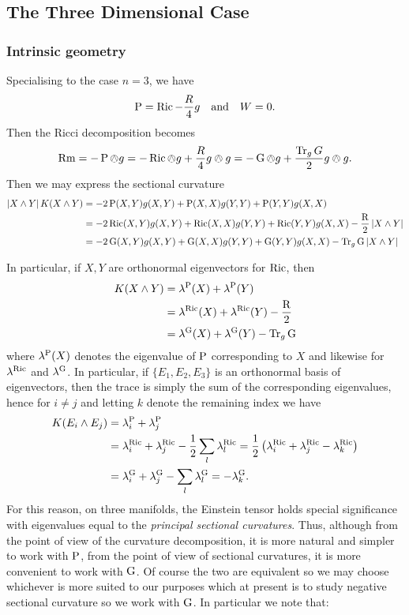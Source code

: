 \documentclass[a4paper, 12pt]{amsart}
\begin{document}
\subsection{The Three Dimensional Case}
\label{subsec:notation_threedim}

\subsubsection{Intrinsic geometry}

Specialising to the case \(n = 3\), we have
\[
\operatorname{P} = \operatorname{Ric} - \frac{R}{4} g \quad \text{and} \quad W = 0.
\]
Then the Ricci decomposition becomes
\[
\operatorname{Rm} = -\operatorname{P} \owedge g = -\operatorname{Ric} \owedge g + \frac{R}{4} g \owedge g = -\operatorname{G} \owedge g + \frac{\operatorname{Tr}_g G}{2} g \owedge g.
\]
Then we may express the sectional curvature
\begin{align*}
\left\lvert{X \wedge Y}\right\rvert K(X \wedge Y) &= -2\operatorname{P}(X, Y) g(X, Y) + \operatorname{P}(X, X) g(Y, Y) + \operatorname{P}(Y, Y) g(X, X) \\
&= -2\operatorname{Ric}(X, Y) g(X, Y) + \operatorname{Ric}(X, X) g(Y, Y) + \operatorname{Ric}(Y, Y) g(X, X) - \frac{\operatorname{R}}{2} \left\lvert{X \wedge Y}\right\rvert \\
&= -2\operatorname{G}(X, Y) g(X, Y) + \operatorname{G}(X, X) g(Y, Y) + \operatorname{G}(Y, Y) g(X, X) - \operatorname{Tr}_g \operatorname{G} \left\lvert{X \wedge Y}\right\rvert \\
\end{align*}

In particular, if \(X, Y\) are orthonormal eigenvectors for \(\operatorname{Ric}\), then
\begin{align*}
K(X \wedge Y) &= \lambda^{\operatorname{P}}(X) + \lambda^{\operatorname{P}}(Y) \\
&= \lambda^{\operatorname{Ric}} (X) + \lambda^{\operatorname{Ric}} (Y) - \frac{\operatorname{R}}{2} \\
&= \lambda^{\operatorname{G}} (X) + \lambda^{\operatorname{G}} (Y) - \operatorname{Tr}_g \operatorname{G} \\
\end{align*}
where \(\lambda^{\operatorname{P}}(X)\) denotes the eigenvalue of \(\operatorname{P}\) corresponding to \(X\) and likewise for \(\lambda^{\operatorname{Ric}}\) and \(\lambda^{\operatorname{G}}\). In particular, if \(\{E_1, E_2, E_3\}\) is an orthonormal basis of eigenvectors, then the trace is simply the sum of the corresponding eigenvalues, hence for \(i \ne j\) and letting \(k\) denote the remaining index we have
\begin{align*}
K(E_i \wedge E_j) &= \lambda^{\operatorname{P}}_i + \lambda^{\operatorname{P}}_j \\
&= \lambda^{\operatorname{Ric}}_i  + \lambda^{\operatorname{Ric}}_j - \frac{1}{2} \sum_l \lambda^{\operatorname{Ric}}_l = \frac{1}{2}\left(\lambda^{\operatorname{Ric}}_i + \lambda^{\operatorname{Ric}}_j -\lambda^{\operatorname{Ric}}_k\right) \\
&= \lambda^{\operatorname{G}}_i + \lambda^{\operatorname{G}}_j - \sum_l \lambda^{\operatorname{G}}_l = -\lambda^{\operatorname{G}}_k.
\end{align*}
For this reason, on three manifolds, the Einstein tensor holds special significance with eigenvalues equal to the \emph{principal sectional curvatures}. Thus, although from the point of view of the curvature decomposition, it is more natural and simpler to work with \(\operatorname{P}\), from the point of view of sectional curvatures, it is more convenient to work with \(\operatorname{G}\). Of course the two are equivalent so we may choose whichever is more suited to our purposes which at present is to study negative sectional curvature so we work with \(\operatorname{G}\). In particular we note that:
\end{document}
